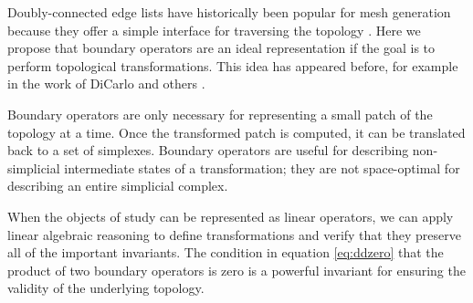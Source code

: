 \documentclass[twocolumn]{article}
\begin{document}
Doubly-connected edge lists have historically been popular for mesh generation because they offer a simple interface for traversing the topology \cite{guibas1985primitives}.
Here we propose that boundary operators are an ideal representation if the goal is to perform topological transformations.
This idea has appeared before, for example in the work of DiCarlo and others \cite{dicarlo2007solid}.

Boundary operators are only necessary for representing a small patch of the topology at a time.
Once the transformed patch is computed, it can be translated back to a set of simplexes.
Boundary operators are useful for describing non-simplicial intermediate states of a transformation; they are not space-optimal for describing an entire simplicial complex.

When the objects of study can be represented as linear operators, we can apply linear algebraic reasoning to define transformations and verify that they preserve all of the important invariants.
The condition in equation \eqref{eq:ddzero} that the product of two boundary operators is zero is a powerful invariant for ensuring the validity of the underlying topology.



\end{document}
